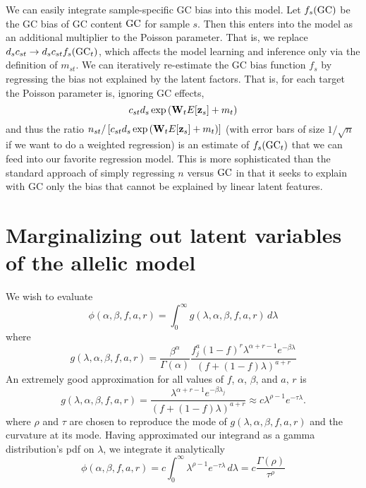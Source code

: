 \documentclass[nofootinbib,amssymb,amsmath]{revtex4}
\newcommand{\vz}{{\bf z}}
\newcommand{\vW}{{\bf W}}
\begin{document}
We can easily integrate sample-specific GC bias into this model.  Let $f_s({\rm GC})$ be the GC bias of GC content ${\rm GC}$ for sample $s$.  Then this enters into the model as an additional multiplier to the Poisson parameter.  That is, we replace $d_s c_{st} \rightarrow d_s c_{st} f_s({\rm GC}_t)$, which affects the model learning and inference only via the definition of $m_{st}$.  We can iteratively re-estimate the GC bias function $f_s$ by regressing the bias not explained by the latent factors.  That is, for each target the Poisson parameter is, ignoring GC effects,
\begin{equation}
c_{st} d_s \exp \left( \vW_t E[\vz_s] + m_t \right)
\end{equation}
and thus the ratio $n_{st} / \left[ c_{st} d_s \exp \left( \vW_t E[\vz_s] + m_t \right) \right]$ (with error bars of size $1/\sqrt{n}$ if we want to do a weighted regression) is an estimate of $f_s({\rm GC}_t)$ that we can feed into our favorite regression model.  This is more sophisticated than the standard approach of simply regressing $n$ versus ${\rm GC}$ in that it seeks to explain with GC only the bias that cannot be explained by linear latent features.

\appendix

\section{Marginalizing out latent variables of the allelic model} \label{marginalizing}
We wish to evaluate
%
\begin{equation}
\phi(\alpha, \beta, f, a, r) = \int_0^\infty g(\lambda, \alpha, \beta, f, a, r) \, d \lambda 
\end{equation}
%
where
%
\begin{equation}
g(\lambda, \alpha, \beta, f, a, r) =  \frac{\beta^\alpha}{\Gamma(\alpha)}  \frac{ f_j^{a} (1 - f)^{r}  \lambda^{\alpha + r - 1} e^{-\beta \lambda}}{ \left( f + (1-f) \lambda \right)^{a+r}} 
\end{equation}
%
An extremely good approximation for all values of $f$, $\alpha$, $\beta$, and $a, \, r$ is
\begin{equation}
g(\lambda, \alpha, \beta, f, a, r) = \frac{\lambda^{\alpha + r - 1} e^{-\beta \lambda_j}}{ \left( f + (1-f) \lambda \right)^{a+r}} \approx c \lambda^{\rho - 1} e^{-\tau \lambda}.
\end{equation}
where $\rho$ and $\tau$ are chosen to reproduce the mode of $g(\lambda, \alpha, \beta, f, a, r)$ and the curvature at its mode.  Having approximated our integrand as a gamma distribution's pdf on $\lambda$, we integrate it analytically
%
\begin{equation}
\phi(\alpha, \beta, f, a, r) = c \int_0^\infty \lambda^{\rho - 1} e^{-\tau \lambda} \, d \lambda = c \frac{\Gamma(\rho)}{\tau^\rho}
\end{equation}
%
\end{document}
